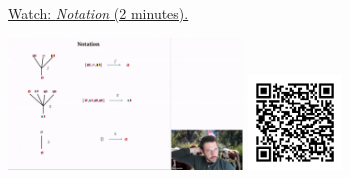 
\begin{minipage}{10cm}
    \href{https://act4e-spring21.netlify.app/videos/spring2021-operads-a:notation-operad.html}{Watch: \emph{Notation} (2 minutes).}
        
    \href{https://act4e-spring21.netlify.app/videos/spring2021-operads-a:notation-operad.html}{\includegraphics[height=3.5cm]{spring2021-operads-a:notation-operad/thumbnails.jpg}}
    \href{https://act4e-spring21.netlify.app/videos/spring2021-operads-a:notation-operad.html}{\includegraphics[height=2.5cm]{spring2021-operads-a:notation-operad/qrcode.png}}
\end{minipage}
